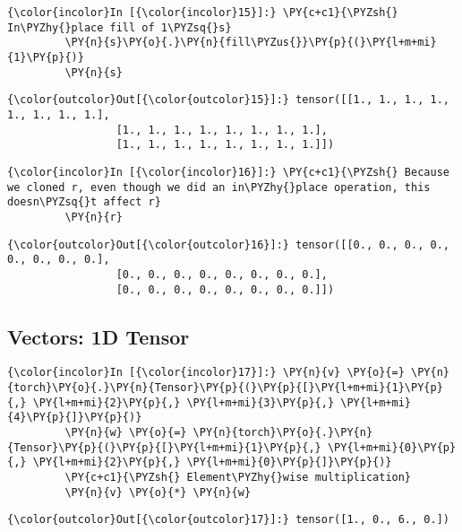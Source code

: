 \begin{Verbatim}[commandchars=\\\{\}]
{\color{incolor}In [{\color{incolor}15}]:} \PY{c+c1}{\PYZsh{} In\PYZhy{}place fill of 1\PYZsq{}s}
         \PY{n}{s}\PY{o}{.}\PY{n}{fill\PYZus{}}\PY{p}{(}\PY{l+m+mi}{1}\PY{p}{)} 
         \PY{n}{s}
\end{Verbatim}


\begin{Verbatim}[commandchars=\\\{\}]
{\color{outcolor}Out[{\color{outcolor}15}]:} tensor([[1., 1., 1., 1., 1., 1., 1., 1.],
                 [1., 1., 1., 1., 1., 1., 1., 1.],
                 [1., 1., 1., 1., 1., 1., 1., 1.]])
\end{Verbatim}
            
\begin{Verbatim}[commandchars=\\\{\}]
{\color{incolor}In [{\color{incolor}16}]:} \PY{c+c1}{\PYZsh{} Because we cloned r, even though we did an in\PYZhy{}place operation, this doesn\PYZsq{}t affect r}
         \PY{n}{r} 
\end{Verbatim}


\begin{Verbatim}[commandchars=\\\{\}]
{\color{outcolor}Out[{\color{outcolor}16}]:} tensor([[0., 0., 0., 0., 0., 0., 0., 0.],
                 [0., 0., 0., 0., 0., 0., 0., 0.],
                 [0., 0., 0., 0., 0., 0., 0., 0.]])
\end{Verbatim}
          

\subsection{Vectors: 1D Tensor}
\begin{Verbatim}[commandchars=\\\{\}]
{\color{incolor}In [{\color{incolor}17}]:} \PY{n}{v} \PY{o}{=} \PY{n}{torch}\PY{o}{.}\PY{n}{Tensor}\PY{p}{(}\PY{p}{[}\PY{l+m+mi}{1}\PY{p}{,} \PY{l+m+mi}{2}\PY{p}{,} \PY{l+m+mi}{3}\PY{p}{,} \PY{l+m+mi}{4}\PY{p}{]}\PY{p}{)}
         \PY{n}{w} \PY{o}{=} \PY{n}{torch}\PY{o}{.}\PY{n}{Tensor}\PY{p}{(}\PY{p}{[}\PY{l+m+mi}{1}\PY{p}{,} \PY{l+m+mi}{0}\PY{p}{,} \PY{l+m+mi}{2}\PY{p}{,} \PY{l+m+mi}{0}\PY{p}{]}\PY{p}{)}
         \PY{c+c1}{\PYZsh{} Element\PYZhy{}wise multiplication}
         \PY{n}{v} \PY{o}{*} \PY{n}{w} 
\end{Verbatim}


\begin{Verbatim}[commandchars=\\\{\}]
{\color{outcolor}Out[{\color{outcolor}17}]:} tensor([1., 0., 6., 0.])
\end{Verbatim}
            
